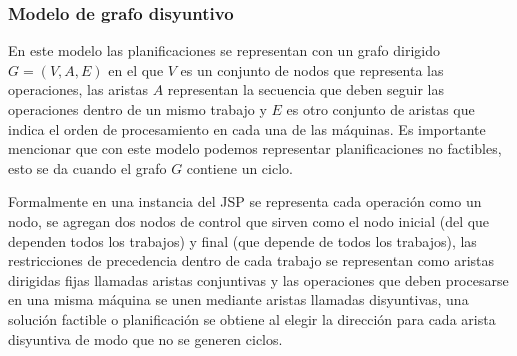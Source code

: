 \subsubsection*{Modelo de grafo disyuntivo} 
En este modelo las planificaciones se representan con un grafo dirigido $G=(V,A,E)$ en el que $V$ es un conjunto de nodos que representa las operaciones, las aristas $A$ representan la secuencia que deben seguir las operaciones dentro de un mismo trabajo y $E$ es otro conjunto de aristas que indica el orden de procesamiento en cada una de las máquinas. Es importante mencionar que con este modelo podemos representar planificaciones no factibles, esto se da cuando el grafo $G$ contiene un ciclo.


Formalmente en una instancia del JSP se representa cada operación como un nodo, se agregan dos nodos de control que sirven como el nodo inicial (del que dependen todos los trabajos) y final (que depende de todos los trabajos), las restricciones de precedencia dentro de cada trabajo se representan como aristas dirigidas fijas llamadas aristas conjuntivas y las operaciones que deben procesarse en una misma máquina se unen mediante aristas llamadas disyuntivas, una solución factible o planificación se obtiene al elegir la dirección para cada arista disyuntiva de modo que no se generen ciclos.   

